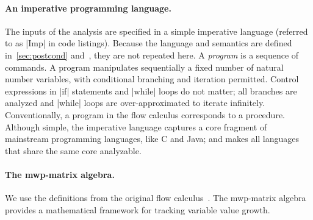 \paragraph*{An imperative programming language.}
The inputs of the analysis are specified in a simple imperative language (referred to as \pr|Imp| in code listings).
Because the language and semantics are defined in~\autoref{sec:postcond} and~, they are not repeated here.
A \emph{program} is a sequence of commands.
A program manipulates sequentially a fixed number of natural number variables, with conditional branching and iteration permitted.
Control expressions in \pr|if| statements and \pr|while| loops do not matter;
all branches are analyzed and \pr|while| loops are over-approximated to iterate infinitely.
Conventionally, a program in the flow calculus corresponds to a procedure.
Although simple, the imperative language captures a core fragment of mainstream programming languages,
like C
and  Java;
and makes all languages that share the same core analyzable.

\paragraph*{The mwp-matrix algebra.}
We use the definitions from the original flow calculus~\cite{jones2009}.
The mwp-matrix algebra provides a mathematical framework for tracking variable value growth.

